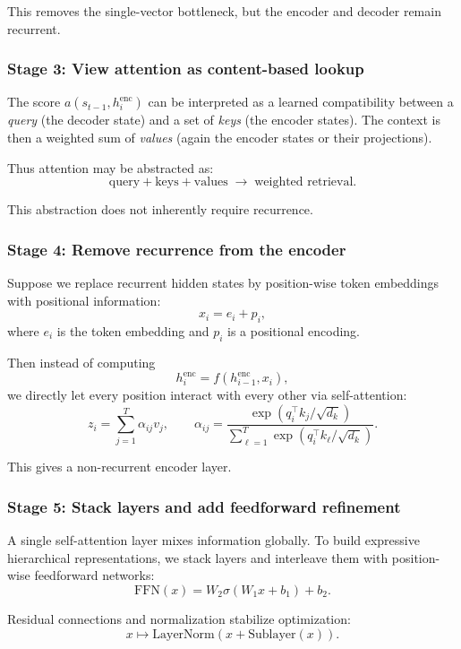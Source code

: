 This removes the single-vector bottleneck, but the encoder and decoder remain recurrent.

\subsubsection{Stage 3: View attention as content-based lookup}

The score \(a(s_{t-1}, h_i^{\text{enc}})\) can be interpreted as a learned compatibility between a \emph{query} (the decoder state) and a set of \emph{keys} (the encoder states). The context is then a weighted sum of \emph{values} (again the encoder states or their projections).

Thus attention may be abstracted as:
\[
\text{query} + \text{keys} + \text{values} \;\longrightarrow\; \text{weighted retrieval}.
\]

This abstraction does not inherently require recurrence.

\subsubsection{Stage 4: Remove recurrence from the encoder}

Suppose we replace recurrent hidden states by position-wise token embeddings with positional information:
\[
x_i = e_i + p_i,
\]
where \(e_i\) is the token embedding and \(p_i\) is a positional encoding.

Then instead of computing
\[
h_i^{\text{enc}} = f(h_{i-1}^{\text{enc}},x_i),
\]
we directly let every position interact with every other via self-attention:
\[
z_i = \sum_{j=1}^T \alpha_{ij} v_j,
\qquad
\alpha_{ij}
=
\frac{\exp(q_i^\top k_j / \sqrt{d_k})}
{\sum_{\ell=1}^T \exp(q_i^\top k_\ell / \sqrt{d_k})}.
\]

This gives a non-recurrent encoder layer.

\subsubsection{Stage 5: Stack layers and add feedforward refinement}

A single self-attention layer mixes information globally. To build expressive hierarchical representations, we stack layers and interleave them with position-wise feedforward networks:
\[
\mathrm{FFN}(x) = W_2 \sigma(W_1 x + b_1) + b_2.
\]

Residual connections and normalization stabilize optimization:
\[
x \mapsto \mathrm{LayerNorm}(x + \mathrm{Sublayer}(x)).
\]

